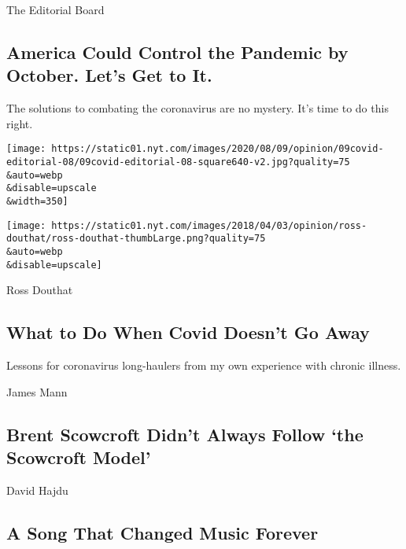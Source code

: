 The Editorial Board

\hypertarget{america-could-control-the-pandemic-by-october-lets-get-to-it}{%
\subsection{America Could Control the Pandemic by October. Let's Get to
It.}\label{america-could-control-the-pandemic-by-october-lets-get-to-it}}

The solutions to combating the coronavirus are no mystery. It's time to
do this right.

\href{/2020/08/08/opinion/sunday/coronavirus-response-testing-lockdown.html}{}

\texttt{[image: https://static01.nyt.com/images/2020/08/09/opinion/09covid-editorial-08/09covid-editorial-08-square640-v2.jpg?quality=75\\\&auto=webp\\\&disable=upscale\\\&width=350]}

\href{/2020/08/08/opinion/sunday/covid-lyme-treatment-medicine.html}{}

\texttt{[image: https://static01.nyt.com/images/2018/04/03/opinion/ross-douthat/ross-douthat-thumbLarge.png?quality=75\\\&auto=webp\\\&disable=upscale]}

Ross Douthat

\hypertarget{what-to-do-when-covid-doesnt-go-away}{%
\subsection{What to Do When Covid Doesn't Go
Away}\label{what-to-do-when-covid-doesnt-go-away}}

Lessons for coronavirus long-haulers from my own experience with chronic
illness.

\href{/2020/08/08/opinion/brent-scowcroft-model-foreign-policy.html}{}

James Mann

\hypertarget{brent-scowcroft-didnt-always-follow-the-scowcroft-model}{%
\subsection{Brent Scowcroft Didn't Always Follow `the Scowcroft
Model'}\label{brent-scowcroft-didnt-always-follow-the-scowcroft-model}}

\href{/2020/08/08/opinion/sunday/crazy-blues-mamie-smith.html}{}

David Hajdu

\hypertarget{a-song-that-changed-music-forever}{%
\subsection{A Song That Changed Music
Forever}\label{a-song-that-changed-music-forever}}

